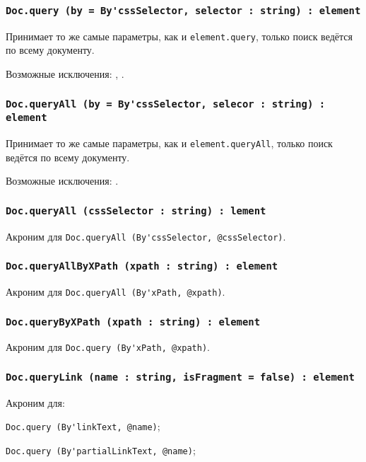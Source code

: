 \subsubsection{\lstinline|Doc.query (by = By'cssSelector, selector : string) : element|}

Принимает то же самые параметры, как и \lstinline|element.query|, только поиск ведётся по всему документу.

Возможные исключения: , .

\subsubsection{\lstinline|Doc.queryAll (by = By'cssSelector, selecor : string) : element|}

Принимает то же самые параметры, как и \lstinline|element.queryAll|, только поиск ведётся по всему документу. 

Возможные исключения: .

\subsubsection{\lstinline|Doc.queryAll (cssSelector : string) : lement|}

Акроним для \lstinline|Doc.queryAll (By'cssSelector, @cssSelector)|.

\subsubsection{\lstinline|Doc.queryAllByXPath (xpath : string) : element|}

Акроним для \lstinline|Doc.queryAll (By'xPath, @xpath)|.

\subsubsection{\lstinline|Doc.queryByXPath (xpath : string) : element|}

Акроним для \lstinline|Doc.query (By'xPath, @xpath)|.

\subsubsection{\lstinline|Doc.queryLink (name : string, isFragment = false) : element|}

Акроним для:
\begin{icItems}
	\item \lstinline|Doc.query (By'linkText, @name)|;
	\item \lstinline|Doc.query (By'partialLinkText, @name)|;
\end{icItems}

